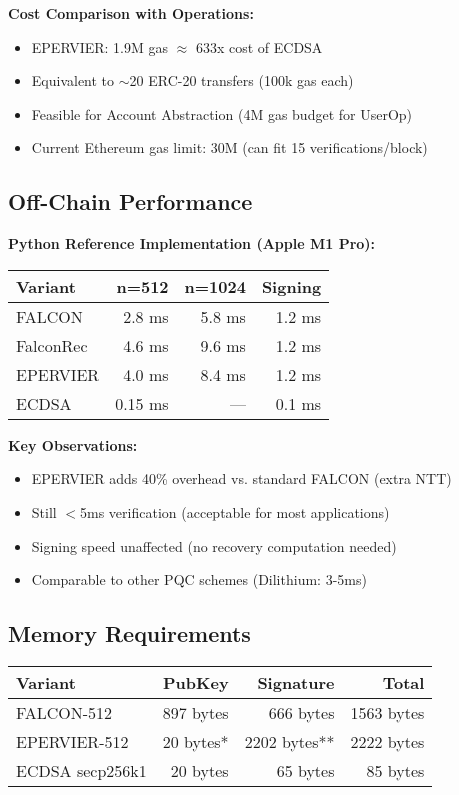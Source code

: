 \documentclass[11pt,a4paper]{article}
\begin{document}
\textbf{Cost Comparison with Operations:}
\begin{itemize}
    \item EPERVIER: 1.9M gas $\approx$ 633x cost of ECDSA
    \item Equivalent to $\sim$20 ERC-20 transfers (100k gas each)
    \item Feasible for Account Abstraction (4M gas budget for UserOp)
    \item Current Ethereum gas limit: 30M (can fit 15 verifications/block)
\end{itemize}

\subsection{Off-Chain Performance}

\textbf{Python Reference Implementation (Apple M1 Pro):}
\begin{center}
\begin{tabular}{lrrr}
\hline
\textbf{Variant} & \textbf{n=512} & \textbf{n=1024} & \textbf{Signing} \\
\hline
FALCON & 2.8 ms & 5.8 ms & 1.2 ms \\
FalconRec & 4.6 ms & 9.6 ms & 1.2 ms \\
EPERVIER & 4.0 ms & 8.4 ms & 1.2 ms \\
\hline
ECDSA & 0.15 ms & --- & 0.1 ms \\
\hline
\end{tabular}
\end{center}

\textbf{Key Observations:}
\begin{itemize}
    \item EPERVIER adds 40\% overhead vs. standard FALCON (extra NTT)
    \item Still $<$5ms verification (acceptable for most applications)
    \item Signing speed unaffected (no recovery computation needed)
    \item Comparable to other PQC schemes (Dilithium: 3-5ms)
\end{itemize}

\subsection{Memory Requirements}

\begin{center}
\begin{tabular}{lrrr}
\hline
\textbf{Variant} & \textbf{PubKey} & \textbf{Signature} & \textbf{Total} \\
\hline
FALCON-512 & 897 bytes & 666 bytes & 1563 bytes \\
EPERVIER-512 & 20 bytes* & 2202 bytes** & 2222 bytes \\
ECDSA secp256k1 & 20 bytes & 65 bytes & 85 bytes \\
\hline
\end{tabular}
\end{center}
\end{document}
